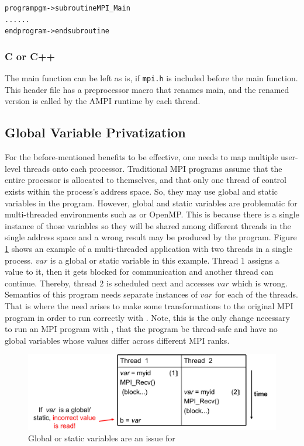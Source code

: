 \documentclass[10pt]{article}
\begin{document}
\begin{alltt}

program pgm -> subroutine MPI_Main
	...		    		      ...
end program -> end subroutine
\end{alltt}

\subsubsection{C or C++}

The main function can be left as is, if \texttt{mpi.h} is included before the main function. 
This header file has a preprocessor macro that renames main, and 
the renamed version is called by the AMPI runtime by each thread.


\subsection{Global Variable Privatization}

For the before-mentioned benefits to be effective, one needs to map multiple
user-level threads onto each processor. Traditional MPI programs assume that the
entire processor is allocated to themselves, and that only one thread of
control exists within the process's address space. So, they may use global and
static variables in the program. However, global and static variables are
problematic for multi-threaded environments such as \ampi{} or OpenMP.
This is because there is a single instance of those variables so they will be 
shared among different threads in the single address space and a wrong result may be produced by the program.
Figure \ref{fig_global} shows an example of a multi-threaded application with 
two threads in a single process. $var$ is a global or static variable in this 
example. Thread 1 assigns a value to it, then it gets blocked for communication 
and another thread can continue. Thereby, thread 2 is scheduled next and 
accesses $var$ which is wrong. Semantics of this program needs separate 
instances of $var$ for each of the threads. That is where the need arises
to make some transformations to the original MPI program in order to run
correctly with \ampi{}. Note, this is the only change necessary to run an MPI 
program with \ampi{}, that the program be thread-safe and have no global variables
whose values differ across different MPI ranks.

\begin{figure}[h]
\centering
\includegraphics[width=4.6in]{figs/global.png}
\caption{Global or static variables are an issue for \ampi{}}
\label{fig_global}
\end{figure}
\end{document}
